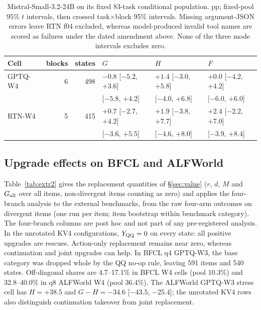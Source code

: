 \begin{table}[t]
\centering%
\renewcommand{\arraystretch}{1.12}\fontsize{8.5}{10}\selectfont\setlength{\tabcolsep}{4pt}
\begin{tabular}{@{}lrrlll@{}}
\toprule
Cell & blocks & states & $G$ & $H$ & $F$ \\
\midrule
GPTQ-W4 & 6 & 498 & $-0.8$ [$-5.2$, $+3.6$] & $+1.4$ [$-3.0$, $+5.8$] & $+0.0$ [$-4.2$, $+4.2$] \\
 & & & [$-5.8$, $+4.2$] & [$-4.0$, $+6.8$] & [$-6.0$, $+6.0$] \\
RTN-W4 & 5 & 415 & $+0.7$ [$-2.7$, $+4.2$] & $+1.9$ [$-3.8$, $+7.7$] & $+2.4$ [$-2.2$, $+7.0$] \\
 & & & [$-3.6$, $+5.5$] & [$-4.6$, $+8.0$] & [$-3.9$, $+8.4$] \\

\bottomrule
\end{tabular}
\caption{Mistral-Small-3.2-24B on its fixed 83-task conditional population. pp; fixed-pool 95\% $t$ intervals, then crossed task$\times$block 95\% intervals. Missing argument-JSON errors leave RTN f04 excluded, whereas model-produced invalid tool names are scored as failures under the dated amendment above. None of the three mode intervals excludes zero.}
\label{tab:mistral-modes}
\end{table}

\subsection{Upgrade effects on BFCL and ALFWorld}
\label{app:extr2}

Table~\ref{tab:extr2} gives the replacement quantities of \S\ref{sec:value} ($r$, $d$, $M$ and $G_{\mathrm{all}}$ over all items, non-divergent items counting as zero) and applies the four-branch analysis to the external benchmarks, from the raw four-arm outcomes on divergent items (one run per item; item bootstrap within benchmark category). The four-branch columns are post hoc and not part of any pre-registered analysis. In the unrotated KV4 configurations, $Y_{\mathrm{QQ}}=0$ on every state: all positive upgrades are rescues. Action-only replacement remains near zero, whereas continuation and joint upgrades can help. In BFCL q4 GPTQ-W3, the base category was dropped whole by the QQ no-op rule, leaving 591 items and 540 states. %
Off-diagonal shares are 4.7--17.1\% in BFCL W4 cells (pool 10.3\%) and 32.8--40.0\% in q8 ALFWorld W4 (pool 36.4\%). The ALFWorld GPTQ-W3 stress cell has $H=+38.5$ and $G-H=-34.6$ [$-43.5$, $-25.4$]\pp{}; the unrotated KV4 rows also distinguish continuation takeover from joint replacement. %

